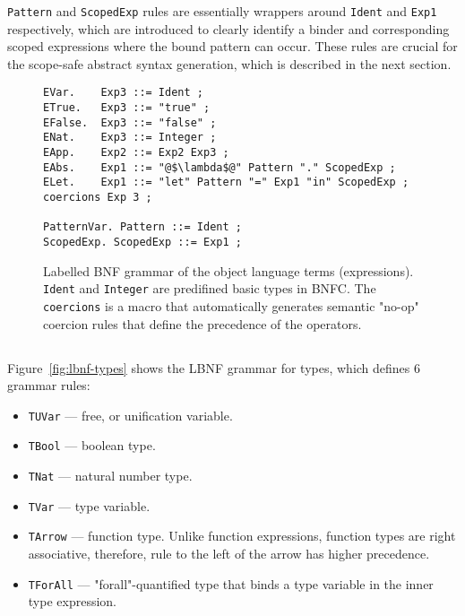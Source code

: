 \texttt{Pattern} and \texttt{ScopedExp} rules are essentially wrappers around \texttt{Ident} and \texttt{Exp1} respectively, which are introduced to clearly identify a binder and corresponding scoped expressions where the bound pattern can occur. These rules are crucial for the scope-safe abstract syntax generation, which is described in the next section.

\begin{figure}[H]
  \begin{verbatim}
EVar.    Exp3 ::= Ident ;
ETrue.   Exp3 ::= "true" ;
EFalse.  Exp3 ::= "false" ;
ENat.    Exp3 ::= Integer ;
EApp.    Exp2 ::= Exp2 Exp3 ;
EAbs.    Exp1 ::= "@$\lambda$@" Pattern "." ScopedExp ;
ELet.    Exp1 ::= "let" Pattern "=" Exp1 "in" ScopedExp ;
coercions Exp 3 ;

PatternVar. Pattern ::= Ident ;
ScopedExp. ScopedExp ::= Exp1 ;
  \end{verbatim}
  \caption[LBNF grammar of the object language terms]{Labelled BNF grammar of the object language terms (expressions). \texttt{Ident} and \texttt{Integer} are predifined basic types in BNFC. The \texttt{coercions} is a macro that automatically generates semantic "no-op" coercion rules that define the precedence of the operators.}
  \label{fig:lbnf-terms}
\end{figure}


\subsection{}

Figure~\ref{fig:lbnf-types} shows the LBNF grammar for types, which defines 6 grammar rules:

\begin{itemize}
  \item \texttt{TUVar} — free, or unification variable.
  \item \texttt{TBool} — boolean type.
  \item \texttt{TNat} — natural number type.
  \item \texttt{TVar} — type variable.
  \item \texttt{TArrow} — function type. Unlike function expressions, function types are right associative, therefore, rule to the left of the arrow has higher precedence.
  \item \texttt{TForAll} — "forall"-quantified type that binds a type variable in the inner type expression.
\end{itemize}

